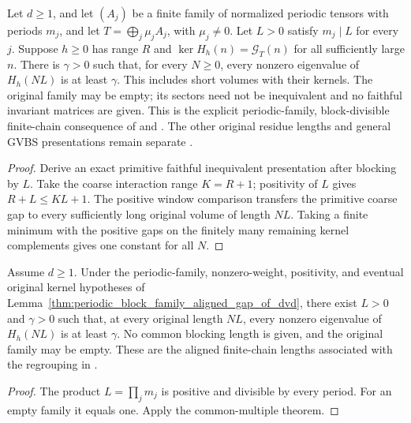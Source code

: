 \begin{lemma}
    \label{thm:periodic_block_family_aligned_gap_of_dvd}
    \leanok
    Let $d\geq1$, and let $(A_j)$ be a finite family of normalized
    periodic tensors with
    periods $m_j$, and let $T=\bigoplus_j\mu_jA_j$, with $\mu_j\neq0$.
    Let $L>0$ satisfy $m_j\mid L$ for every $j$. Suppose $h\geq0$ has
    range $R$ and $\ker H_h(n)=\mathcal G_T(n)$ for all sufficiently
    large $n$. There is $\gamma>0$ such that, for every $N\geq0$, every
    nonzero eigenvalue of $H_h(NL)$ is at least $\gamma$.
    This includes short volumes with their kernels. The original
    family may be empty; its sectors need not be inequivalent and no
    faithful invariant matrices are given. This is the explicit
    periodic-family, block-divisible finite-chain consequence of
    \cite[Theorem~1.2, Section~3, equations (3.12)--(3.14)]{Nachtergaele1996Spectral}
    and \cite[Lemma~6]{DeLasCuevas2017Irreducible}.
    The other original residue lengths and general GVBS presentations
    remain separate
    \cite{gap:nachtergaele96_infinite_volume_ground_projection}.
\end{lemma}
\begin{proof}\leanok
    Derive an exact primitive faithful inequivalent presentation after
    blocking by $L$. Take the coarse interaction range $K=R+1$;
    positivity of $L$ gives $R+L\leq KL+1$. The positive window comparison
    transfers the primitive coarse gap to every sufficiently long
    original volume of length $NL$. Taking a finite minimum with the
    positive gaps on the finitely many remaining kernel complements
    gives one constant for all $N$.
\end{proof}

\begin{lemma}
    \label{thm:periodic_block_family_aligned_gap_exists}
    \leanok
    Assume $d\geq1$. Under the periodic-family, nonzero-weight, positivity,
    and eventual original kernel hypotheses of
    Lemma~\ref{thm:periodic_block_family_aligned_gap_of_dvd}, there exist
    $L>0$ and $\gamma>0$ such that, at every original length $NL$, every
    nonzero eigenvalue of $H_h(NL)$ is at least $\gamma$. No common blocking length is given, and the original
    family may be empty. These are the aligned finite-chain lengths
    associated with the regrouping in
    \cite[lines 825--836, Theorem~1.2]{Nachtergaele1996Spectral}.
\end{lemma}
\begin{proof}\leanok
    The product $L=\prod_jm_j$ is positive and divisible by every period.
    For an empty family it equals one. Apply the common-multiple theorem.
\end{proof}


